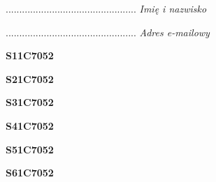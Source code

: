 \begin{turn}{90}\begin{minipage}{\linewidth} \vspace{20mm} ................................................  \textit{Imię i nazwisko}\end{minipage}\end{turn}

\begin{turn}{90}\begin{minipage}{\linewidth} \vspace{20mm} ................................................  \textit{Adres e-mailowy}\end{minipage}\end{turn}

\begin{turn}{90}\huge \begin{minipage}{\linewidth} \vspace{10mm}\textbf{S11C7052}\end{minipage}\end{turn}

\begin{turn}{90}\huge \begin{minipage}{\linewidth} \vspace{10mm}\textbf{S21C7052}\end{minipage}\end{turn}

\begin{turn}{90}\huge \begin{minipage}{\linewidth} \vspace{10mm}\textbf{S31C7052}\end{minipage}\end{turn}

\begin{turn}{90}\huge \begin{minipage}{\linewidth} \vspace{10mm}\textbf{S41C7052}\end{minipage}\end{turn}

\begin{turn}{90}\huge \begin{minipage}{\linewidth} \vspace{10mm}\textbf{S51C7052}\end{minipage}\end{turn}

\begin{turn}{90}\huge \begin{minipage}{\linewidth} \vspace{10mm}\textbf{S61C7052}\end{minipage}\end{turn}


